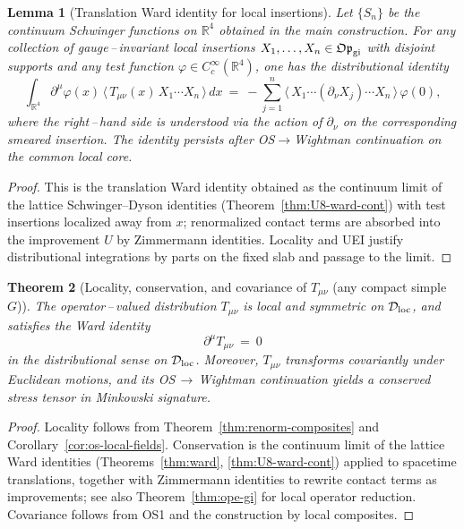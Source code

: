 \documentclass[11pt]{amsart}
\theoremstyle{plain}
\newtheorem{theorem}{Theorem}[section]
\newtheorem{lemma}[theorem]{Lemma}
\theoremstyle{definition}
\theoremstyle{remark}
\begin{document}
\begin{lemma}[Translation Ward identity for local insertions]\label{lem:ward-translation}
Let $\{S_n\}$ be the continuum Schwinger functions on $\mathbb R^4$ obtained in the main construction. For any collection of gauge\,–\,invariant local insertions $X_1,\dots,X_n\in \mathfrak{Op}_{\rm gi}$ with disjoint supports and any test function $\varphi\in C_c^\infty(\mathbb R^4)$, one has the distributional identity
\[
  \int_{\mathbb R^4} \partial^\mu\varphi(x)\, \big\langle\, T_{\mu\nu}(x)\, X_1\cdots X_n\,\big\rangle\, dx\ =\ -\sum_{j=1}^n \big\langle\, X_1\cdots (\partial_\nu X_j)\cdots X_n\,\big\rangle\, \varphi(0),
\]
where the right\,–\,hand side is understood via the action of $\partial_\nu$ on the corresponding smeared insertion. The identity persists after OS$\to$Wightman continuation on the common local core.
\end{lemma}
\begin{proof}
This is the translation Ward identity obtained as the continuum limit of the lattice Schwinger–Dyson identities (Theorem~\ref{thm:U8-ward-cont}) with test insertions localized away from $x$; renormalized contact terms are absorbed into the improvement $U$ by Zimmermann identities. Locality and UEI justify distributional integrations by parts on the fixed slab and passage to the limit.
\end{proof}

\begin{theorem}[Locality, conservation, and covariance of $T_{\mu\nu}$ (any compact simple $G$)]\label{thm:T-properties}
The operator\,–\,valued distribution $T_{\mu\nu}$ is local and symmetric on $\mathcal D_{\rm loc}$, and satisfies the Ward identity
\[
  \partial^{\mu} T_{\mu\nu}\ =\ 0
\]
in the distributional sense on $\mathcal D_{\rm loc}$. Moreover, $T_{\mu\nu}$ transforms covariantly under Euclidean motions, and its OS\,$\to$\,Wightman continuation yields a conserved stress tensor in Minkowski signature.
\end{theorem}
\begin{proof}
Locality follows from Theorem~\ref{thm:renorm-composites} and Corollary~\ref{cor:os-local-fields}. Conservation is the continuum limit of the lattice Ward identities (Theorems~\ref{thm:ward}, \ref{thm:U8-ward-cont}) applied to spacetime translations, together with Zimmermann identities to rewrite contact terms as improvements; see also Theorem~\ref{thm:ope-gi} for local operator reduction. Covariance follows from OS1 and the construction by local composites.
\end{proof}
\end{document}
